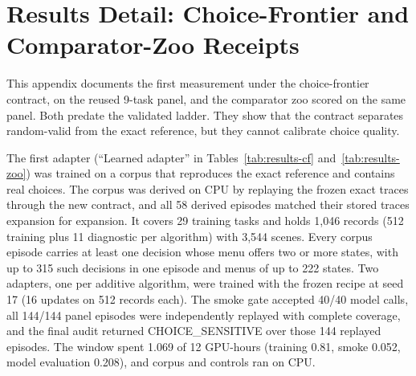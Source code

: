 \section{Results Detail: Choice-Frontier and Comparator-Zoo Receipts}
\label{app:results-cf}

This appendix documents the first measurement under the choice-frontier contract, on the reused 9-task panel, and the comparator zoo scored on the same panel. Both predate the validated ladder. They show that the contract separates random-valid from the exact reference, but they cannot calibrate choice quality.

The first adapter (``Learned adapter'' in Tables~\ref{tab:results-cf} and~\ref{tab:results-zoo}) was trained on a corpus that reproduces the exact reference and contains real choices. The corpus was derived on CPU by replaying the frozen exact traces through the new contract, and all 58 derived episodes matched their stored traces expansion for expansion. It covers 29 training tasks and holds 1,046 records (512 training plus 11 diagnostic per algorithm) with 3,544 scenes. Every corpus episode carries at least one decision whose menu offers two or more states, with up to 315 such decisions in one episode and menus of up to 222 states. Two adapters, one per additive algorithm, were trained with the frozen recipe at seed 17 (16 updates on 512 records each). The smoke gate accepted 40/40 model calls, all 144/144 panel episodes were independently replayed with complete coverage, and the final audit returned CHOICE\_SENSITIVE over those 144 replayed episodes. The window spent 1.069 of 12 GPU-hours (training 0.81, smoke 0.052, model evaluation 0.208), and corpus and controls ran on CPU.

